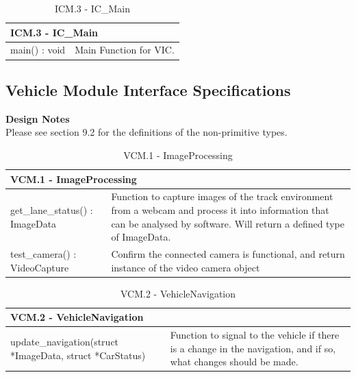 \documentclass [10pt]{article}
\begin{document}
\begin{longtable}{| p{ } | p{ } | }\caption{ICM.3 - IC\_Main} \\\hline  
 \multicolumn{2}{|l|}{\textbf {ICM.3 - IC\_Main}}\\ \hline
 
\rowcolor{tableCell}main() : void & Main Function for VIC. \\ \hline 

\end{longtable}

\subsection{Vehicle Module Interface Specifications}
\textbf{Design Notes} \\
Please see section 9.2 for the definitions of the non-primitive types.
\begin{longtable}{| p{ } | p{ } | }\caption{VCM.1 - ImageProcessing} \\\hline  
 \multicolumn{2}{|l|}{\textbf {VCM.1 - ImageProcessing}}\\ \hline
\cellcolor{tableCell}get\_lane\_status() : ImageData & \cellcolor{tableCell}Function to capture images of the track environment from a webcam and process it into information that can be analysed by software. Will return a defined type of ImageData.  \\ \hline 

test\_camera() : VideoCapture & Confirm the connected camera is functional, and return instance of the video camera object \\ \hline


\end{longtable}

\begin{longtable}{| p{ } | p{ } | }\caption{VCM.2 - VehicleNavigation} \\\hline  
 \multicolumn{2}{|l|}{\textbf {VCM.2 - VehicleNavigation}}\\ \hline
\rowcolor{tableCell}update\_navigation(struct *ImageData,  struct *CarStatus) & Function to signal to the vehicle if there is a change in the navigation, and if so, what changes should be made. \\ \hline 



\end{longtable}
\end{document}
